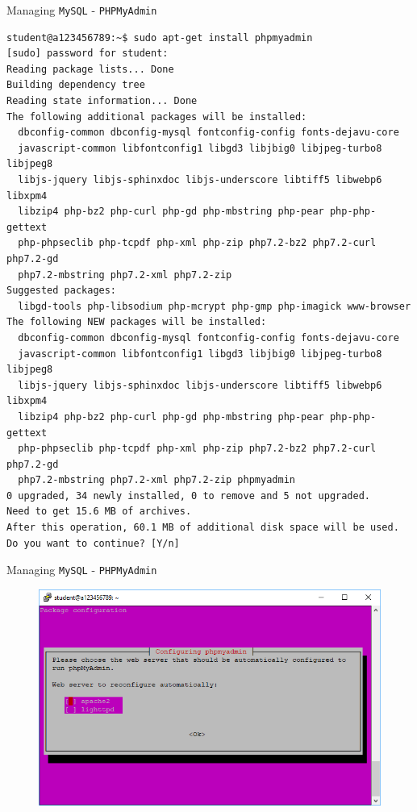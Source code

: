 \documentclass[xcolor=table,aspectratio=169]{beamer}
\begin{document}
\begin{frame}[fragile]{Managing \texttt{MySQL} - \texttt{PHPMyAdmin}}
  \begin{tcolorbox}
    \lstset{
      basicstyle=\Tiny\ttfamily,
    }
    \begin{lstlisting}
student@a123456789:~$ sudo apt-get install phpmyadmin
[sudo] password for student:
Reading package lists... Done
Building dependency tree
Reading state information... Done
The following additional packages will be installed:
  dbconfig-common dbconfig-mysql fontconfig-config fonts-dejavu-core
  javascript-common libfontconfig1 libgd3 libjbig0 libjpeg-turbo8 libjpeg8
  libjs-jquery libjs-sphinxdoc libjs-underscore libtiff5 libwebp6 libxpm4
  libzip4 php-bz2 php-curl php-gd php-mbstring php-pear php-php-gettext
  php-phpseclib php-tcpdf php-xml php-zip php7.2-bz2 php7.2-curl php7.2-gd
  php7.2-mbstring php7.2-xml php7.2-zip
Suggested packages:
  libgd-tools php-libsodium php-mcrypt php-gmp php-imagick www-browser
The following NEW packages will be installed:
  dbconfig-common dbconfig-mysql fontconfig-config fonts-dejavu-core
  javascript-common libfontconfig1 libgd3 libjbig0 libjpeg-turbo8 libjpeg8
  libjs-jquery libjs-sphinxdoc libjs-underscore libtiff5 libwebp6 libxpm4
  libzip4 php-bz2 php-curl php-gd php-mbstring php-pear php-php-gettext
  php-phpseclib php-tcpdf php-xml php-zip php7.2-bz2 php7.2-curl php7.2-gd
  php7.2-mbstring php7.2-xml php7.2-zip phpmyadmin
0 upgraded, 34 newly installed, 0 to remove and 5 not upgraded.
Need to get 15.6 MB of archives.
After this operation, 60.1 MB of additional disk space will be used.
Do you want to continue? [Y/n]
    \end{lstlisting}
  \end{tcolorbox}
\end{frame}

\begin{frame}{Managing \texttt{MySQL} - \texttt{PHPMyAdmin}}
  \begin{figure}
    \begin{center}
      \includegraphics[width=0.7\linewidth]{MySQLInstall1.png}
    \end{center}
  \end{figure}
\end{frame}
\end{document}
